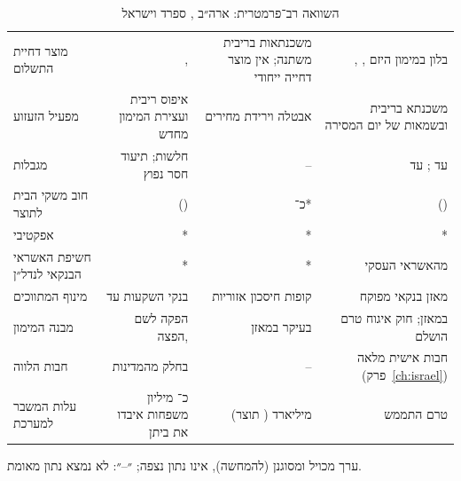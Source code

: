 \begin{table}[!htb]
\centering
\caption[השוואה רב־פרמטרית: ארה״ב, ספרד וישראל]{השוואה רב־פרמטרית: ארה״ב , ספרד  וישראל }
\label{tab:ch4-comparison}
\small
\begin{tabularx}{\tabmaxwidth}{>{\raggedleft\arraybackslash}p{2.6cm} R R R}
\toprule
{} &  &  &  \\
\midrule
מוצר דחיית התשלום & ,  \cite{fcic2011} & משכנתאות בריבית משתנה; אין מוצר דחייה ייחודי \cite{akin2014} & , , בלון במימון היזם \cite{boi_circular2816} \\
\midrule
מפעיל הזעזוע & איפוס ריבית ועצירת המימון מחדש \cite{mayer2009} & אבטלה וירידת מחירים \cite{akin2014} & משכנתא בריבית ובשמאות של יום המסירה \cite{boi2026_resloans} \\
\midrule
מגבלות  & חלשות; תיעוד חסר נפוץ \cite{mayer2009} & -- &  עד ;  עד  \cite{boi_directive329} \\
\midrule
חוב משקי הבית לתוצר &  () \cite{bis_hhdebt} & כ־* &  () \cite{bis_hhdebt} \\
\midrule
{} אפקטיבי & * & * & * \\
\midrule
חשיפת האשראי הבנקאי לנדל״ן & * & * &  מהאשראי העסקי \cite{boi2026_recredit} \\
\midrule
מינוף המתווכים & בנקי השקעות עד  \cite{fcic2011} & קופות חיסכון אזוריות \cite{akin2014} & מאזן בנקאי מפוקח \cite{boi2026_recredit} \\
\midrule
מבנה המימון & הפקה לשם הפצה,  \cite{keys2010} & בעיקר במאזן \cite{akin2014} & במאזן; חוק איגוח טרם הושלם \cite{boi_survey2025,hapoalim_q3_2026} \\
\midrule
חבות הלווה &  בחלק מהמדינות \cite{ghent2011} & -- & חבות אישית מלאה (פרק~\ref{ch:israel}) \\
\midrule
עלות המשבר למערכת & כ־ מיליון משפחות איבדו את ביתן \cite{fcic2011} &  מיליארד ( תוצר) \cite{bde2017note} & טרם התממש \\
\bottomrule
\end{tabularx}

\vspace{2pt}
{\footnotesize * ערך מכויל ומסוגנן (להמחשה), אינו נתון נצפה; ״--״: לא נמצא נתון מאומת.}
\end{table}

